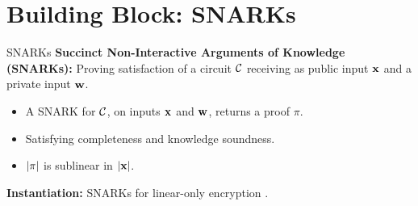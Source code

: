 \section{Building Block: SNARKs}

\begin{frame}{SNARKs}
	\textbf{Succinct Non-Interactive Arguments of Knowledge (SNARKs):} Proving satisfaction of a circuit $\mathcal{C}$ receiving as public input $\mathbf{x}$ and a private input $\mathbf{w}$. 
	\begin{itemize}
		\item A SNARK for $\mathcal{C}$, on inputs $\mathbf{x}$ and $\mathbf{w}$, returns a proof $\pi$.
		\item Satisfying completeness and knowledge soundness.
		\item $\left|\pi\right|$ is sublinear in $\left|\mathbf{x}\right|$.
	\end{itemize}
	
	\textbf{Instantiation:} SNARKs for linear-only encryption \cite{TCC:BCIPO13}.
\end{frame}